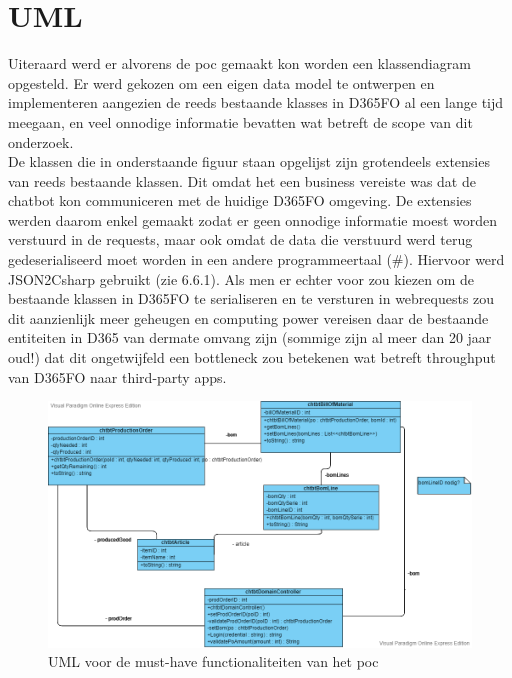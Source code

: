 \section{UML}
Uiteraard werd er alvorens de poc gemaakt kon worden een klassendiagram opgesteld. Er werd gekozen om een eigen data model te ontwerpen en implementeren aangezien de reeds bestaande klasses in D365FO al een lange tijd meegaan, en veel onnodige informatie bevatten wat betreft de scope van dit onderzoek.\\De klassen die in onderstaande figuur staan opgelijst zijn grotendeels extensies van reeds bestaande klassen. Dit omdat het een business vereiste was dat de chatbot kon communiceren met de huidige D365FO omgeving. De extensies werden daarom enkel gemaakt zodat er geen onnodige informatie moest worden verstuurd in de requests, maar ook omdat de data die verstuurd werd terug gedeserialiseerd moet worden in een andere programmeertaal (\C#). Hiervoor werd JSON2Csharp gebruikt (zie 6.6.1). Als men er echter voor zou kiezen om de bestaande klassen in D365FO te serialiseren en te versturen in webrequests zou dit aanzienlijk meer geheugen en computing power vereisen daar de bestaande entiteiten in D365 van dermate omvang zijn (sommige zijn al meer dan 20 jaar oud!) dat dit ongetwijfeld een bottleneck zou betekenen wat betreft throughput van D365FO naar third-party apps. 
\begin{figure}[h!]
    \centering
    \includegraphics[width=1\textwidth]{img/Uml}
    \caption{UML voor de must-have functionaliteiten van het poc}
\end{figure}
